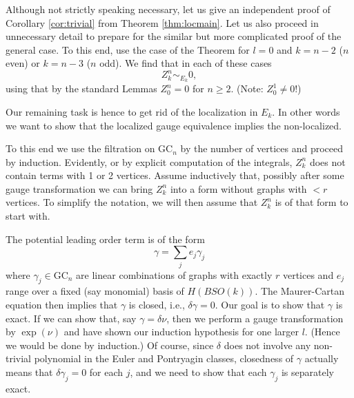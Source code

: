 \documentclass[a4paper]{amsart}
\theoremstyle{plain}
\theoremstyle{definition}
\newcommand{\GC}{\mathrm{GC}}
\newcommand{\SO}{\mathit{SO}}
\begin{document}
Although not strictly speaking necessary, let us give an independent proof of Corollary \ref{cor:trivial} from Theorem \ref{thm:locmain}. Let us also proceed in unnecessary detail to prepare for the similar but more complicated proof of the general case.
To this end, use the case of the Theorem for $l=0$ and $k=n-2$ ($n$ even) or $k=n-3$ ($n$ odd).
 We find that in each of these cases
 \[
 Z_{k}^n \sim_{E_k} 0,
 \]
 using that by the standard Lemmas $Z_0^n=0$ for $n \geq 2$. (Note: $Z_0^1\neq 0$!)
 
Our remaining task is hence to get rid of the localization in $E_k$. In other words we want to show that the localized gauge equivalence implies the non-localized.

To this end we use the filtration on $\GC_n$ by the number of vertices and proceed by induction.
Evidently, or by explicit computation of the integrals, $Z_{k}^n$ does not contain terms with 1 or 2 vertices.
Assume inductively that, possibly after some gauge transformation we can bring $Z_{k}^n$ into a form without graphs with $< r$ vertices. To simplify the notation, we will then assume that $Z_{k}^n$ is of that form to start with.

The potential leading order term is of the form 
\[
\gamma = \sum_j e_j \gamma_j
\]
where $\gamma_j\in \GC_n$ are linear combinations of graphs with exactly $r$ vertices and $e_j$ range over a fixed (say monomial) basis of $H(B\SO(k))$.
The Maurer-Cartan equation then implies that $\gamma$ is closed, i.e., $\delta \gamma=0$. Our goal is to show that $\gamma$ is exact. If we can show that, say $\gamma=\delta \nu$, then we perform a gauge transformation by $\exp(\nu)$ and have shown our induction hypothesis for one larger $l$. (Hence we would be done by induction.)
Of course, since $\delta$ does not involve any non-trivial polynomial in the Euler and Pontryagin classes, closedness of $\gamma$ actually means that $\delta \gamma_j=0$ for each $j$, and we need to show that each $\gamma_j$ is separately exact.
\end{document}
